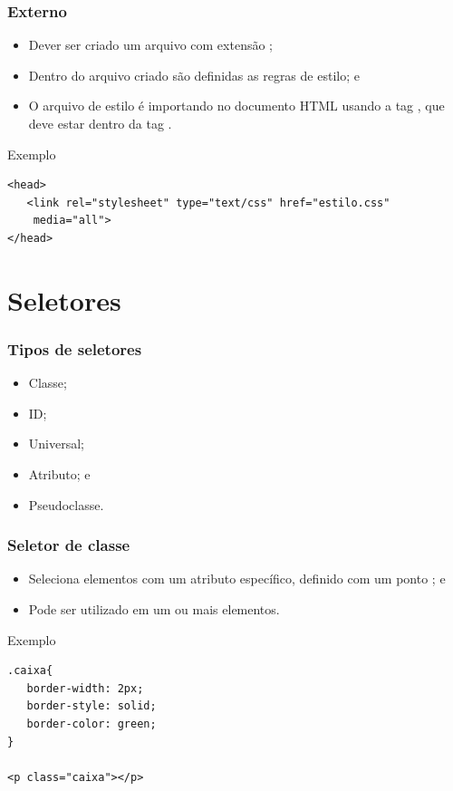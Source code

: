 \documentclass[aspectratio=169]{beamer} %
\begin{document}
\begin{frame}[fragile]
	\frametitle{Externo}
	
	\begin{itemize}
		\item Dever ser criado um arquivo com extensão ;
		\item Dentro do arquivo criado são definidas as regras de estilo; e
		\item O arquivo de estilo é importando no documento HTML usando a tag , que deve estar dentro da tag .
	\end{itemize}\vfill
	
	\begin{exampleblock}{Exemplo}
		\begin{lstlisting}
<head>
   <link rel="stylesheet" type="text/css" href="estilo.css" 
    media="all">
</head>
		\end{lstlisting}
	\end{exampleblock}
\end{frame}

\section{Seletores}

\begin{frame}
	\frametitle{Tipos de seletores}
	
	\begin{itemize}
		\item Classe;
		\item ID;
		\item Universal;
		\item Atributo; e
		\item Pseudoclasse.
	\end{itemize}
\end{frame}

\begin{frame}[fragile]
	\frametitle{Seletor de classe}
	
	\begin{itemize}
		\item Seleciona elementos com um atributo  específico, definido com um ponto  ; e
		\item Pode ser utilizado em um ou mais elementos.
	\end{itemize}\vfill
	
	\begin{exampleblock}{Exemplo}
		\begin{lstlisting}
.caixa{
   border-width: 2px;
   border-style: solid;
   border-color: green;
}

<p class="caixa"></p>			
		\end{lstlisting}
	\end{exampleblock}
\end{frame}
\end{document}
